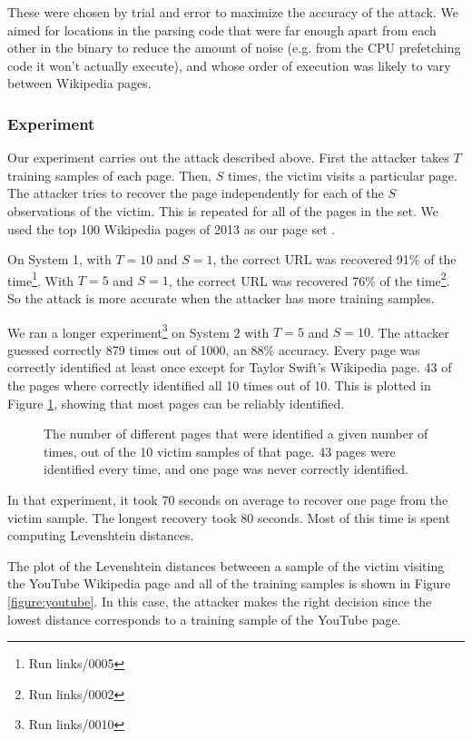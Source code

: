 \documentclass[letterpaper,twocolumn,10pt]{article}
\begin{document}
These were chosen by trial and error to maximize the accuracy of the attack. We
aimed for locations in the parsing code that were far enough apart from each
other in the binary to reduce the amount of noise (e.g. from the CPU prefetching
code it won't actually execute), and whose order of execution was likely to vary
between Wikipedia pages.

\subsubsection{Experiment}

Our experiment carries out the attack described above. First the attacker takes
$T$ training samples of each page. Then, $S$ times, the victim visits
a particular page. The attacker tries to recover the page independently for each
of the $S$ observations of the victim. This is repeated for all of the pages in
the set. We used the top 100 Wikipedia pages of 2013 as our page set
\cite{wikitop2013}.

On System 1, with $T=10$ and $S=1$, the correct URL was recovered 91\% of the
time\footnote{Run links/0005}. With $T=5$ and $S=1$, the correct URL was
recovered 76\% of the time\footnote{Run links/0002}. So the attack is more
accurate when the attacker has more training samples.

We ran a longer experiment\footnote{Run links/0010} on System 2 with $T=5$ and
$S=10$. The attacker guessed correctly 879 times out of 1000, an 88\% accuracy.
Every page was correctly identified at least once except for Taylor Swift's
Wikipedia page. 43 of the pages where correctly identified all 10 times out of
10. This is plotted in Figure \ref{figure:identifycounts}, showing that most
pages can be reliably identified.

\begin{figure}
    \centering
    
    \caption{The number of different
    pages that were identified a given number of times, out of the 10 victim
samples of that page. 43 pages were identified every time, and one page was
never correctly identified.}
    \label{figure:identifycounts}
\end{figure}

In that experiment, it took 70 seconds on average to recover one page from the
victim sample. The longest recovery took 80 seconds. Most of this time is spent
computing Levenshtein distances.

The plot of the Levenshtein distances betweeen a sample of the victim visiting
the YouTube Wikipedia page and all of the training samples is shown in Figure
\ref{figure:youtube}. In this case, the attacker makes the right decision since
the lowest distance corresponds to a training sample of the YouTube page.
\end{document}
